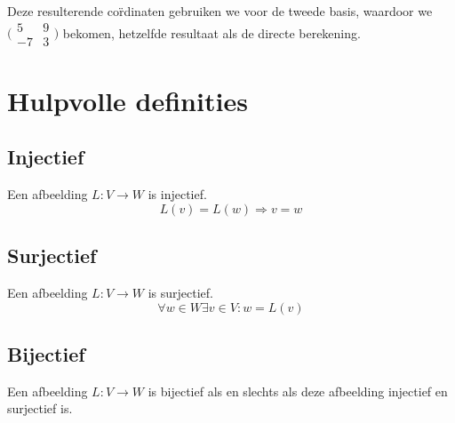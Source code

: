 \documentclass[lineaire_algebra_oplossingen.tex]{subfiles}
\begin{document}
Deze resulterende co\"rdinaten gebruiken we voor de tweede basis, waardoor we $\bigl(
\begin{smallmatrix}
5&9\\ -7&3
\end{smallmatrix}\bigr)$ bekomen, hetzelfde resultaat als de directe berekening.

\section{Hulpvolle definities}
\subsection{Injectief}
Een afbeelding $L: V \rightarrow W$ is injectief.
\[
L(v) = L(w) \Rightarrow v = w
\]
\subsection{Surjectief}
Een afbeelding $L: V \rightarrow W$ is surjectief.
\[
\forall w \in W \exists v \in V: w=L(v)
\]
\subsection{Bijectief}
Een afbeelding $L: V \rightarrow W$ is bijectief als en slechts als deze afbeelding injectief en surjectief is.
\end{document}
